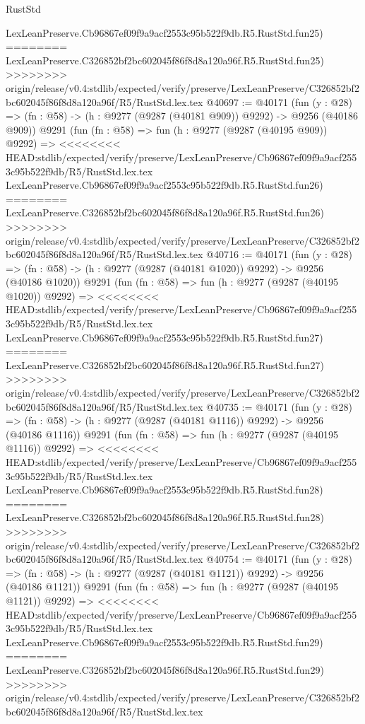 \begin{lexlean}{RustStd}
\begin{coremodule}
{\begin{coremodule}
{{{{{{{{{{{{{{{{{{{{{{{{{{{{{{{{{{{{{{{{{{{{{{{{{{{{{{{    LexLeanPreserve.Cb96867ef09f9a9acf2553c95b522f9db.R5.RustStd.fun25)
========
    LexLeanPreserve.C326852bf2bc602045f86f8d8a120a96f.R5.RustStd.fun25)
>>>>>>>> origin/release/v0.4:stdlib/expected/verify/preserve/LexLeanPreserve/C326852bf2bc602045f86f8d8a120a96f/R5/RustStd.lex.tex
@40697 := @40171
    (fun (y : @28) => (fn : @58) -> (h : @9277 (@9287 (@40181 @909)) @9292) -> @9256 (@40186 @909))
    @9291
    (fun (fn : @58) =>
    fun (h : @9277 (@9287 (@40195 @909)) @9292) =>
<<<<<<<< HEAD:stdlib/expected/verify/preserve/LexLeanPreserve/Cb96867ef09f9a9acf2553c95b522f9db/R5/RustStd.lex.tex
    LexLeanPreserve.Cb96867ef09f9a9acf2553c95b522f9db.R5.RustStd.fun26)
========
    LexLeanPreserve.C326852bf2bc602045f86f8d8a120a96f.R5.RustStd.fun26)
>>>>>>>> origin/release/v0.4:stdlib/expected/verify/preserve/LexLeanPreserve/C326852bf2bc602045f86f8d8a120a96f/R5/RustStd.lex.tex
@40716 := @40171
    (fun (y : @28) =>
    (fn : @58) -> (h : @9277 (@9287 (@40181 @1020)) @9292) -> @9256 (@40186 @1020))
    @9291
    (fun (fn : @58) =>
    fun (h : @9277 (@9287 (@40195 @1020)) @9292) =>
<<<<<<<< HEAD:stdlib/expected/verify/preserve/LexLeanPreserve/Cb96867ef09f9a9acf2553c95b522f9db/R5/RustStd.lex.tex
    LexLeanPreserve.Cb96867ef09f9a9acf2553c95b522f9db.R5.RustStd.fun27)
========
    LexLeanPreserve.C326852bf2bc602045f86f8d8a120a96f.R5.RustStd.fun27)
>>>>>>>> origin/release/v0.4:stdlib/expected/verify/preserve/LexLeanPreserve/C326852bf2bc602045f86f8d8a120a96f/R5/RustStd.lex.tex
@40735 := @40171
    (fun (y : @28) =>
    (fn : @58) -> (h : @9277 (@9287 (@40181 @1116)) @9292) -> @9256 (@40186 @1116))
    @9291
    (fun (fn : @58) =>
    fun (h : @9277 (@9287 (@40195 @1116)) @9292) =>
<<<<<<<< HEAD:stdlib/expected/verify/preserve/LexLeanPreserve/Cb96867ef09f9a9acf2553c95b522f9db/R5/RustStd.lex.tex
    LexLeanPreserve.Cb96867ef09f9a9acf2553c95b522f9db.R5.RustStd.fun28)
========
    LexLeanPreserve.C326852bf2bc602045f86f8d8a120a96f.R5.RustStd.fun28)
>>>>>>>> origin/release/v0.4:stdlib/expected/verify/preserve/LexLeanPreserve/C326852bf2bc602045f86f8d8a120a96f/R5/RustStd.lex.tex
@40754 := @40171
    (fun (y : @28) =>
    (fn : @58) -> (h : @9277 (@9287 (@40181 @1121)) @9292) -> @9256 (@40186 @1121))
    @9291
    (fun (fn : @58) =>
    fun (h : @9277 (@9287 (@40195 @1121)) @9292) =>
<<<<<<<< HEAD:stdlib/expected/verify/preserve/LexLeanPreserve/Cb96867ef09f9a9acf2553c95b522f9db/R5/RustStd.lex.tex
    LexLeanPreserve.Cb96867ef09f9a9acf2553c95b522f9db.R5.RustStd.fun29)
========
    LexLeanPreserve.C326852bf2bc602045f86f8d8a120a96f.R5.RustStd.fun29)
>>>>>>>> origin/release/v0.4:stdlib/expected/verify/preserve/LexLeanPreserve/C326852bf2bc602045f86f8d8a120a96f/R5/RustStd.lex.tex
}}}}}}}}}}}}}}}}}}}}}}}}}}}}}}}}}}}}}}}}}}}}}}}}}}}}}}}
\end{coremodule}}
\end{coremodule}
\end{lexlean}

